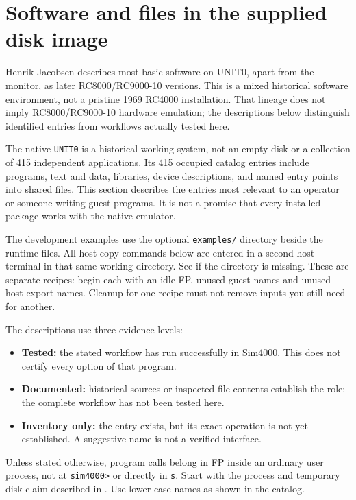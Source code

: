 \chapter{Software and files in the supplied disk image}\label{software-and-files-in-the-supplied-disk-image}

Henrik Jacobsen describes most basic software on UNIT0, apart from the monitor, as later RC8000/RC9000-10 versions. This is a mixed historical software environment, not a pristine 1969 RC4000 installation. That lineage does not imply RC8000/RC9000-10 hardware emulation; the descriptions below distinguish identified entries from workflows actually tested here.

The native \passthrough{\lstinline!UNIT0!} is a historical working system, not an empty disk or a collection of 415 independent applications. Its 415 occupied catalog entries include programs, text and data, libraries, device descriptions, and named entry points into shared files. This section describes the entries most relevant to an operator or someone writing guest programs. It is not a promise that every installed package works with the native emulator.

The development examples use the optional \texttt{examples/} directory beside
the runtime files. All host copy commands below are entered in a second host
terminal in that same working directory. See
if the directory is missing. These are separate recipes: begin each with an idle
FP, unused guest names and unused host export names. Cleanup for one recipe
must not remove inputs you still need for another.

The descriptions use three evidence levels:

\begin{itemize}
\tightlist
\item
  \textbf{Tested:} the stated workflow has run successfully in Sim4000. This does not certify every option of that program.
\item
  \textbf{Documented:} historical sources or inspected file contents establish the role; the complete workflow has not been tested here.
\item
  \textbf{Inventory only:} the entry exists, but its exact operation is not yet established. A suggestive name is not a verified interface.
\end{itemize}

Unless stated otherwise, program calls belong in FP inside an ordinary user process, not at \passthrough{\lstinline!sim4000>!} or directly in \passthrough{\lstinline!s!}. Start with the process and temporary disk claim described in . Use lower-case names as shown in the catalog.

